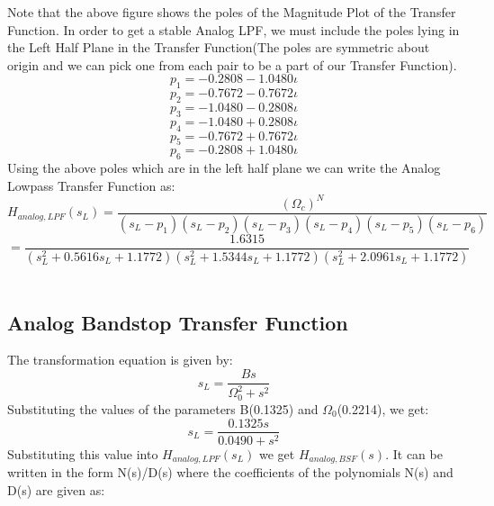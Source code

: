 \documentclass[12pt]{article}
\begin{document}
Note that the above figure shows the poles of the Magnitude Plot of the Transfer Function. In order to get a stable Analog LPF, we must include the poles lying in the Left Half Plane in the Transfer Function(The poles are symmetric about origin and we can pick one from each pair to be a part of our Transfer Function).
\begin{equation*}
p_{1} = -0.2808 - 1.0480\iota
\end{equation*}
\begin{equation*}
p_{2} = -0.7672 - 0.7672\iota
\end{equation*}
\begin{equation*}
p_{3} = -1.0480 - 0.2808\iota
\end{equation*}
\begin{equation*}
p_{4} =-1.0480 + 0.2808\iota
\end{equation*}
\begin{equation*}
p_{5} = -0.7672  + 0.7672\iota
\end{equation*}
\begin{equation*}
p_{6} = -0.2808 + 1.0480\iota
\end{equation*}
\newpage
Using the above poles which are in the left half plane we can write the Analog Lowpass Transfer Function as:
\begin{equation*}
H_{analog,LPF}(s_{L}) = \frac{(\Omega _{c})^{N}}{(s_{L}-p_{1})(s_{L}-p_{2})(s_{L}-p_{3})(s_{L}-p_{4})(s_{L}-p_{5})(s_{L}-p_{6})}
\end{equation*}
\begin{equation*}
= \frac{1.6315}{(s_{L}^{2}+0.5616s_{L}+1.1772)(s_{L}^{2} + 1.5344s_{L} +1.1772)(s_{L}^{2}+2.0961s_{L}+1.1772)} 
\end{equation*}
\\%
\subsection{Analog Bandstop Transfer Function}
The transformation equation is given by:
\begin{equation*}
s_{L} = \frac{Bs}{\Omega _{0}^{2} + s^{2}}
\end{equation*}
Substituting the values of the parameters B(0.1325) and $\Omega _{0}$(0.2214), we get:
\begin{equation*}
s_{L} = \frac{0.1325s}{0.0490 + s^{2}}
\end{equation*}
Substituting this value into $H_{analog,LPF}(s_{L})$ we get $H_{analog,BSF}(s)$. It can be written in the form N(s)/D(s) where the coefficients of the polynomials N(s) and D(s) are given as:\\
\end{document}
